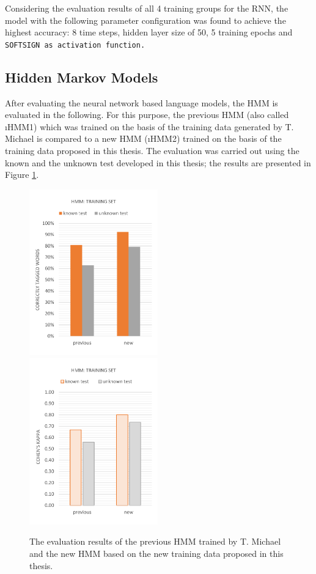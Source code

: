 Considering the evaluation results of all 4 training groups for the RNN, the model with the following parameter configuration was found to achieve the highest accuracy: 8 time steps, hidden layer size of 50, 5 training epochs and \tt{SOFTSIGN} as activation function.

\subsection{Hidden Markov Models}\label{c.evaluation.results.hmm}
After evaluating the neural network based language models, the HMM is evaluated in the following. For this purpose, the previous HMM (also called \i{HMM1}) which was trained on the basis of the training data generated by T. Michael \cite{michael2016} is compared to a new HMM (\i{HMM2}) trained on the basis of the training data proposed in this thesis. The evaluation was carried out using the known and the unknown test developed in this thesis; the results are presented in Figure \ref{f.evaluation.hmm}.

\begin{figure}[H]
\centering
{}
{\includegraphics[width=0.495\textwidth]{images/evaluation_hmm}}
{\includegraphics[width=0.495\textwidth]{images/evaluation_hmm_k}}
\vspace{1em}
\caption[HMM Evaluation]{The evaluation results of the previous HMM trained by T. Michael \cite{michael2016} and the new HMM based on the new training data proposed in this thesis.}
\label{f.evaluation.hmm}
\end{figure}

